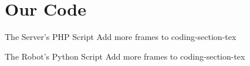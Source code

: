 \section{Our Code}
    
    \frame{\sectionpage}
    
    \begin{frame}{The Server's PHP Script}
         \centering
         \huge{Add more frames to coding-section-tex}
    \end{frame}

	\begin{frame}{The Robot's Python Script}
		\centering
		\huge{Add more frames to coding-section-tex}
	\end{frame}